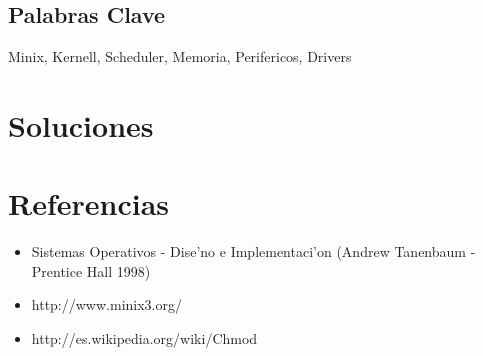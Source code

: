 \documentclass[spanish, a4paper, 11pt]{article}
\begin{document}
\subtitulo{}
\maketitle

\subsection*{Palabras Clave}
Minix, Kernell, Scheduler, Memoria, Perifericos, Drivers

\clearpage
\tableofcontents
\newpage

\section{Soluciones}












\clearpage


\clearpage
\section{Referencias}
\begin{itemize}
\item Sistemas Operativos - Dise'no e Implementaci'on (Andrew Tanenbaum - Prentice Hall 1998)
\item http://www.minix3.org/
\item http://es.wikipedia.org/wiki/Chmod
\end{itemize}
\end{document}
